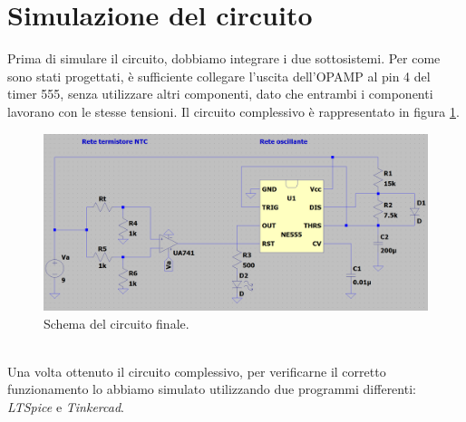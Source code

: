 \documentclass{report}
\begin{document}
\newpage
\section{Simulazione del circuito}
Prima di simulare il circuito, dobbiamo integrare i due sottosistemi. Per come sono stati progettati, è sufficiente collegare l'uscita dell'OPAMP al pin 4 del timer 555, senza utilizzare altri componenti, dato che entrambi i componenti lavorano con le stesse tensioni. Il circuito complessivo è rappresentato in figura \ref{figura:schemaFinale}.
\begin{figure}[h!]
	\centering
	\includegraphics[width=\textwidth]{immagini/schemaFinale}
	\caption{Schema del circuito finale.} 
	\label{figura:schemaFinale}
\end{figure}
\\Una volta ottenuto il circuito complessivo, per verificarne il corretto funzionamento lo abbiamo simulato utilizzando due programmi differenti: \textit{LTSpice} e \textit{Tinkercad}.  
\end{document}
